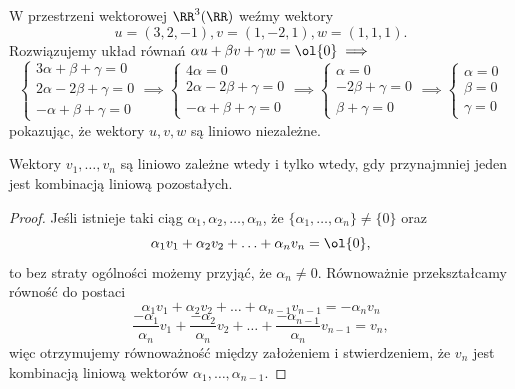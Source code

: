 \begin{example}
    W przestrzeni wektorowej $\RR^3(\RR)$ weźmy wektory
    \[ u = (3, 2, -1), v = (1, -2, 1), w = (1, 1, 1). \]
    Rozwiązujemy układ równań $\alpha u + \beta v + \gamma w = \ol{0} \implies$
    \begin{equation*}
        \begin{cases}
            3\alpha + \beta + \gamma = 0 \\
            2\alpha - 2\beta + \gamma = 0 \\
            -\alpha + \beta + \gamma = 0
        \end{cases} \implies
        \begin{cases}
            4\alpha = 0 \\
            2\alpha - 2\beta + \gamma = 0 \\
            -\alpha + \beta + \gamma = 0
        \end{cases} \implies
        \begin{cases}
            \alpha = 0 \\
            - 2\beta + \gamma = 0 \\
            \beta + \gamma = 0
        \end{cases} \implies
        \begin{cases}
            \alpha = 0 \\
            \beta = 0 \\
            \gamma = 0
        \end{cases}
    \end{equation*}
    pokazując, że wektory $u, v, w$ są liniowo niezależne.
\end{example}

\begin{theorem}
    \label{t:linear independence}
    Wektory $v_1, \ldots, v_n$ są liniowo zależne wtedy i tylko wtedy, gdy przynajmniej jeden jest kombinacją liniową pozostałych.
\end{theorem}
\begin{proof}
    Jeśli istnieje taki ciąg $\alpha_1, \alpha_2, \ldots, \alpha_n$, że $\{\alpha_1, \ldots, \alpha_n\} \neq \{0\}$ oraz
    \[ \alpha_1v_1 + \alpha_2v_2 + \ldots + \alpha_nv_n = \ol{0}, \]
    to bez straty ogólności możemy przyjąć, że $\alpha_n \neq 0$. Równoważnie przekształcamy równość do postaci
    \[ \alpha_1v_1 + \alpha_2v_2 + \ldots + \alpha_{n-1}v_{n-1} = -\alpha_nv_n \]
    \[ \frac{-\alpha_1}{\alpha_n}v_1 + \frac{-\alpha_2}{\alpha_n}v_2 + \ldots + \frac{-\alpha_{n-1}}{\alpha_n}v_{n-1} = v_n, \]
    więc otrzymujemy równoważność między założeniem i stwierdzeniem, że $v_n$ jest kombinacją liniową wektorów $\alpha_1, \ldots, \alpha_{n-1}$.
\end{proof}

